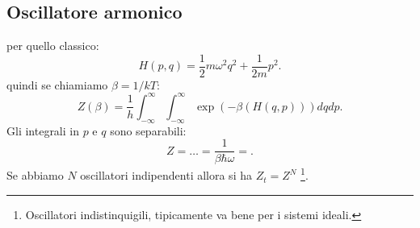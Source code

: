 \subsection{Oscillatore armonico}%
per quello classico:
\[
	H( p,q) = \frac{1}{2}m\omega ^2q^2 + \frac{1}{2m}p^2
.\] 
quindi se chiamiamo $\beta  = 1 /kT$:
\[
	Z( \beta )  = \frac{1}{h}\int_{-\infty}^{\infty} \int_{-\infty}^{\infty} \exp\left( -\beta \left( H( q,p)  \right)  \right) dqdp  
.\] 
Gli integrali in $p$ e $q$ sono separabili:
\[
	Z = \ldots = \frac{1}{\beta \hbar\omega } = 
.\] 
Se abbiamo $N$ oscillatori indipendenti allora si ha $Z_{t} = Z^{N}$ \footnote{Oscillatori indistinquigili, tipicamente va bene per i sistemi ideali.}.
\label{sub:oscillatore_armonico}


